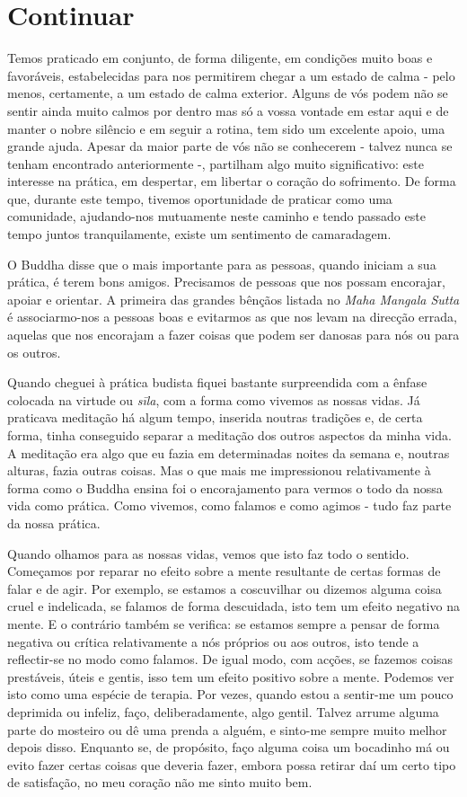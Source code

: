 \chapter{Continuar}

Temos praticado em conjunto, de forma diligente, em condições muito boas
e favoráveis, estabelecidas para nos permitirem chegar a um estado de
calma - pelo menos, certamente, a um estado de calma exterior. Alguns de
vós podem não se sentir ainda muito calmos por dentro mas só a vossa
vontade em estar aqui e de manter o nobre silêncio e em seguir a rotina,
tem sido um excelente apoio, uma grande ajuda. Apesar da maior parte de
vós não se conhecerem - talvez nunca se tenham encontrado anteriormente
-, partilham algo muito significativo: este interesse na prática, em
despertar, em libertar o coração do sofrimento. De forma que, durante
este tempo, tivemos oportunidade de praticar como uma comunidade,
ajudando-nos mutuamente neste caminho e tendo passado este tempo juntos
tranquilamente, existe um sentimento de camaradagem.

O Buddha disse que o mais importante para as pessoas, quando iniciam a
sua prática, é terem bons amigos. Precisamos de \mbox{pessoas} que nos possam
encorajar, apoiar e orientar. A primeira das grandes bênçãos listada no
\emph{Maha Mangala Sutta} é associarmo-nos a pessoas boas e evitarmos as
que nos levam na direcção errada, aquelas que nos encorajam a fazer
coisas que podem ser danosas para nós ou para os outros.

Quando cheguei à prática budista fiquei bastante surpreendida com a
ênfase colocada na virtude ou \emph{sīla}, com a forma como vivemos as
nossas vidas. Já praticava meditação há algum tempo, inserida noutras
tradições e, de certa forma, tinha conseguido separar a meditação dos
outros aspectos da minha vida. A meditação era algo que eu fazia em
determinadas noites da semana e, noutras alturas, fazia outras coisas.
Mas o que mais me impressionou relativamente à forma como o Buddha
ensina foi o encorajamento para vermos o todo da nossa vida como
prática. Como vivemos, como falamos e como agimos - tudo faz parte da
nossa prática.

Quando olhamos para as nossas vidas, vemos que isto faz todo o sentido.
Começamos por reparar no efeito sobre a mente resultante de certas
formas de falar e de agir. Por exemplo, se estamos a coscuvilhar ou
dizemos alguma coisa cruel e indelicada, se falamos de forma descuidada,
isto tem um efeito negativo na mente. E o contrário também se verifica:
se estamos sempre a pensar de forma negativa ou crítica relativamente a
nós próprios ou aos outros, isto tende a reflectir-se no modo como
falamos. De igual modo, com acções, se fazemos coisas prestáveis, úteis
e gentis, isso tem um efeito positivo sobre a mente. Podemos ver isto
como uma espécie de terapia. Por vezes, quando estou a sentir-me um
pouco deprimida ou infeliz, faço, deliberadamente, algo gentil. Talvez
arrume alguma parte do mosteiro ou dê uma prenda a alguém, e sinto-me
sempre muito melhor depois disso. Enquanto se, de propósito, faço alguma
coisa um bocadinho má ou evito fazer certas coisas que deveria fazer,
embora possa retirar daí um certo tipo de satisfação, no meu coração não
me sinto muito bem.

